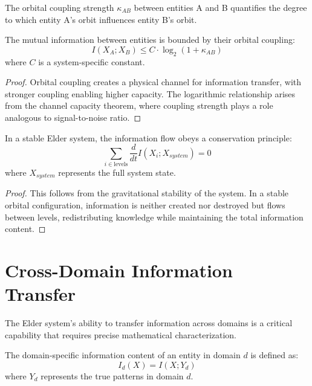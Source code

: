 \begin{definition}
The orbital coupling strength $\kappa_{AB}$ between entities A and B quantifies the degree to which entity A's orbit influences entity B's orbit.
\end{definition}

\begin{theorem}
The mutual information between entities is bounded by their orbital coupling:
\begin{equation}
I(X_A; X_B) \leq C \cdot \log_2(1 + \kappa_{AB})
\end{equation}
where $C$ is a system-specific constant.
\end{theorem}

\begin{proof}
Orbital coupling creates a physical channel for information transfer, with stronger coupling enabling higher capacity. The logarithmic relationship arises from the channel capacity theorem, where coupling strength plays a role analogous to signal-to-noise ratio.
\end{proof}

\begin{theorem}
In a stable Elder system, the information flow obeys a conservation principle:
\begin{equation}
\sum_{i \in \text{levels}} \frac{d}{dt}I(X_i; X_{system}) = 0
\end{equation}
where $X_{system}$ represents the full system state.
\end{theorem}

\begin{proof}
This follows from the gravitational stability of the system. In a stable orbital configuration, information is neither created nor destroyed but flows between levels, redistributing knowledge while maintaining the total information content.
\end{proof}

\section{Cross-Domain Information Transfer}

The Elder system's ability to transfer information across domains is a critical capability that requires precise mathematical characterization.

\begin{definition}
The domain-specific information content of an entity in domain $d$ is defined as:
\begin{equation}
I_d(X) = I(X; Y_d)
\end{equation}
where $Y_d$ represents the true patterns in domain $d$.
\end{definition}

